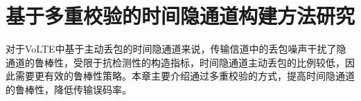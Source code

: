 \chapter{基于多重校验的时间隐通道构建方法研究}
\label{chap:hash}

对于VoLTE中基于主动丢包的时间隐通道来说，传输信道中的丢包噪声干扰了隐通道的鲁棒性，受限于抗检测性的构造指标，时间隐通道主动丢包的比例较低，因此需要更有效的鲁棒性策略。本章主要介绍通过多重校验的方式，提高时间隐通道的鲁棒性，降低传输误码率。







